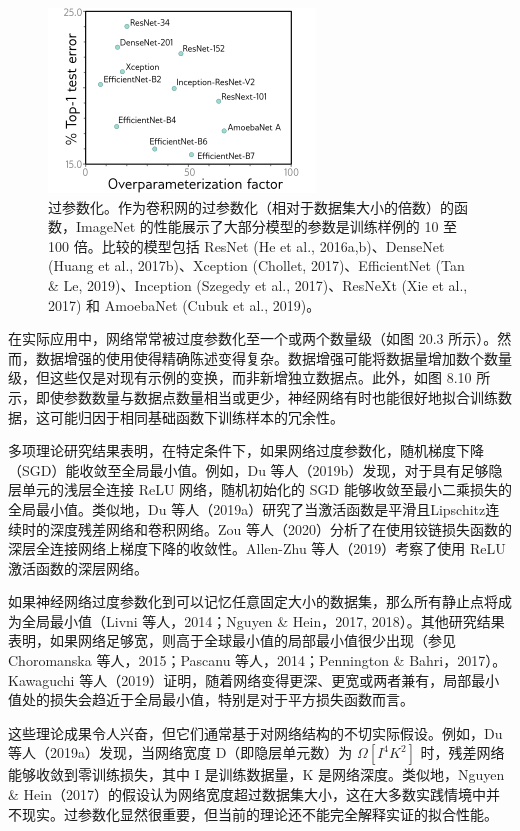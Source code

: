 \begin{figure}[ht!]
\centering
\includegraphics[width=0.7\linewidth]{png/chapter20/WhyOverparam.png}
\caption{过参数化。作为卷积网的过参数化（相对于数据集大小的倍数）的函数，ImageNet 的性能展示了大部分模型的参数是训练样例的 10 至 100 倍。比较的模型包括 ResNet (He et al., 2016a,b)、DenseNet (Huang et al., 2017b)、Xception (Chollet, 2017)、EfficientNet (Tan \& Le, 2019)、Inception (Szegedy et al., 2017)、ResNeXt (Xie et al., 2017) 和 AmoebaNet (Cubuk et al., 2019)。}
\end{figure}

在实际应用中，网络常常被过度参数化至一个或两个数量级（如图 20.3 所示）。然而，数据增强的使用使得精确陈述变得复杂。数据增强可能将数据量增加数个数量级，但这些仅是对现有示例的变换，而非新增独立数据点。此外，如图 8.10 所示，即使参数数量与数据点数量相当或更少，神经网络有时也能很好地拟合训练数据，这可能归因于相同基础函数下训练样本的冗余性。

多项理论研究结果表明，在特定条件下，如果网络过度参数化，随机梯度下降（SGD）能收敛至全局最小值。例如，Du 等人（2019b）发现，对于具有足够隐层单元的浅层全连接 ReLU 网络，随机初始化的 SGD 能够收敛至最小二乘损失的全局最小值。类似地，Du 等人（2019a）研究了当激活函数是平滑且Lipschitz连续时的深度残差网络和卷积网络。Zou 等人（2020）分析了在使用铰链损失函数的深层全连接网络上梯度下降的收敛性。Allen-Zhu 等人（2019）考察了使用 ReLU 激活函数的深层网络。

如果神经网络过度参数化到可以记忆任意固定大小的数据集，那么所有静止点将成为全局最小值（Livni 等人，2014；Nguyen \& Hein，2017, 2018）。其他研究结果表明，如果网络足够宽，则高于全球最小值的局部最小值很少出现（参见 Choromanska 等人，2015；Pascanu 等人，2014；Pennington \& Bahri，2017）。Kawaguchi 等人（2019）证明，随着网络变得更深、更宽或两者兼有，局部最小值处的损失会趋近于全局最小值，特别是对于平方损失函数而言。

这些理论成果令人兴奋，但它们通常基于对网络结构的不切实际假设。例如，Du 等人（2019a）发现，当网络宽度 D（即隐层单元数）为 \(\Omega [I^4K^2]\) 时，残差网络能够收敛到零训练损失，其中 I 是训练数据量，K 是网络深度。类似地，Nguyen \& Hein（2017）的假设认为网络宽度超过数据集大小，这在大多数实践情境中并不现实。过参数化显然很重要，但当前的理论还不能完全解释实证的拟合性能。

